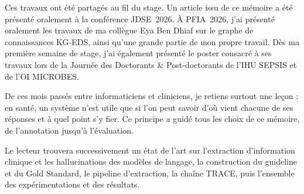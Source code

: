 Ces travaux ont été partagés au fil du stage. Un article issu de ce mémoire a été présenté oralement à la conférence JDSE~2026. À PFIA~2026, j'ai présenté oralement les travaux de ma collègue Eya Ben Dhiaf sur le graphe de connaissances KG-EDS, ainsi qu'une grande partie de mon propre travail. Dès ma première semaine de stage, j'ai également présenté le poster consacré à ses travaux lors de la Journée des Doctorants \& Post-doctorants de l'IHU SEPSIS et de l'OI MICROBES.

De ces mois passés entre informaticiens et cliniciens, je retiens surtout une leçon : en santé, un système n'est utile que si l'on peut savoir d'où vient chacune de ses réponses et à quel point s'y fier. Ce principe a guidé tous les choix de ce mémoire, de l'annotation jusqu'à l'évaluation.

Le lecteur trouvera successivement un état de l'art sur l'extraction d'information clinique et les hallucinations des modèles de langage, la construction du guideline et du Gold Standard, le pipeline d'extraction, la chaîne TRACE, puis l'ensemble des expérimentations et des résultats.
